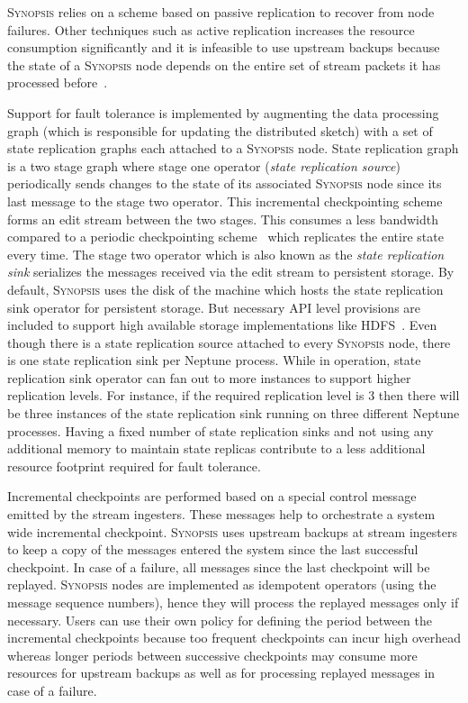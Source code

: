 \textsc{Synopsis} relies on a scheme based on passive replication to recover from node failures.
Other techniques such as active replication increases the resource consumption significantly and it is infeasible to use upstream backups because the state of a \textsc{Synopsis} node depends on the entire set of stream packets it has processed before~\cite{castro2013integrating}.

Support for fault tolerance is implemented by augmenting the data processing graph (which is responsible for updating the distributed sketch) 	with a set of state replication graphs each attached to a \textsc{Synopsis} node.
State replication graph is a two stage graph where stage one operator (\textit{state replication source}) periodically sends changes to the state of its associated \textsc{Synopsis} node since its last message to the stage two operator.
This incremental checkpointing scheme forms an edit stream between the two stages.
This consumes a less bandwidth compared to a periodic checkpointing scheme~ which replicates the entire state every time\cite{castro2013integrating}.
The stage two operator which is also known as the \textit{state replication sink} serializes the messages received via the edit stream to persistent storage.
By default, \textsc{Synopsis} uses the disk of the machine which hosts the state replication sink operator for persistent storage.
But necessary API level provisions are included to support high available storage implementations like HDFS~\cite{borthakur2008hdfs}.
Even though there is a state replication source attached to every \textsc{Synopsis} node, there is one state replication sink per Neptune process.
While in operation, state replication sink operator can fan out to more instances to support higher replication levels.
For instance, if the required replication level is 3 then there will be three instances of the state replication sink running on three different Neptune processes.
Having a fixed number of state replication sinks and not using any additional memory to maintain state replicas contribute to a less additional resource footprint required for fault tolerance.

Incremental checkpoints are performed based on a special control message emitted by the stream ingesters.
These messages help to orchestrate a system wide incremental checkpoint.
\textsc{Synopsis} uses upstream backups at stream ingesters to keep a copy of the messages entered the system since the last successful checkpoint.
In case of a failure, all messages since the last checkpoint will be replayed.
\textsc{Synopsis} nodes are implemented as idempotent operators (using the message sequence numbers), hence they will process the replayed messages only if necessary.
Users can use their own policy for defining the period between the incremental checkpoints because too frequent checkpoints can incur high overhead whereas longer periods between successive checkpoints may consume more resources for upstream backups as well as for processing replayed messages in case of a failure.

